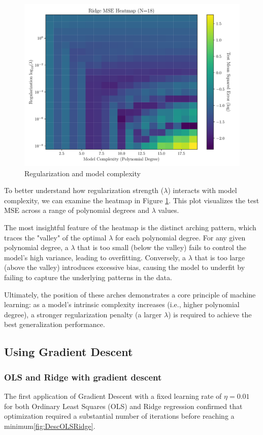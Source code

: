 \documentclass[twocolumn,aps]{revtex4}
\begin{document}
\begin{figure}[h]
    \centering
    \includegraphics[width=.95 \linewidth]{Figures/Ridge_Degree_Lambda_Heatmap.pdf}
    \caption{Regularization and model complexity}
    \label{fig:RidgeHeat}
\end{figure}

To better understand how regularization strength ($\lambda$) interacts with model complexity, we can examine the heatmap in Figure \ref{fig:RidgeHeat}. 
This plot visualizes the test MSE across a range of polynomial degrees and $\lambda$ values.

The most insightful feature of the heatmap is the distinct arching pattern, which traces the "valley" of the optimal $\lambda$ for each polynomial degree.
For any given polynomial degree, a $\lambda$ that is too small (below the valley) fails to control the model's high variance, leading to overfitting.
Conversely, a $\lambda$ that is too large (above the valley) introduces excessive bias, causing the model to underfit by failing to capture the underlying patterns in the data.

Ultimately, the position of these arches demonstrates a core principle of machine learning: as a model's intrinsic complexity increases (i.e., higher polynomial degree), a stronger regularization penalty (a larger $\lambda$) is required to achieve the best generalization performance.

\subsection{Using Gradient Descent}

\subsubsection{OLS and Ridge with gradient descent}
The first application of Gradient Descent with a fixed learning rate of $\eta=0.01$ for both Ordinary Least Squares (OLS) and Ridge regression confirmed that optimization required a substantial number of iterations before reaching a minimum\ref{fig:DescOLSRidge}.
\end{document}
